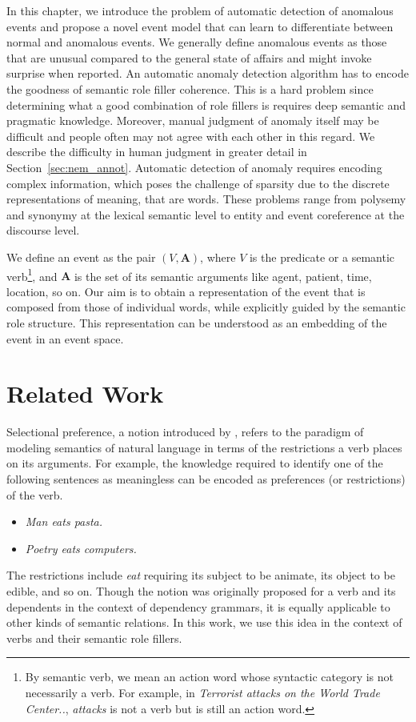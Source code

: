 In this chapter, we introduce the problem of automatic detection of anomalous events
and propose a novel event model that can learn to differentiate
between normal
and anomalous events. We generally define anomalous events as those that are
unusual compared
to the general state of affairs and might invoke surprise when reported. An 
automatic
anomaly detection algorithm has to encode
the goodness of semantic role filler coherence.  This is a hard problem since
determining what a good combination of role fillers is 
requires deep semantic and pragmatic knowledge.  
Moreover, manual judgment of anomaly itself may be difficult and people often
may not agree with each other in this
regard.  We describe the difficulty in human judgment in greater detail in
Section~\ref{sec:nem_annot}.  
Automatic detection of anomaly requires encoding complex information, which
poses the challenge of sparsity
due to the discrete representations of meaning, that are words.  These problems
range from polysemy and synonymy at the 
lexical semantic level to entity and event coreference at the discourse level.

We define an event as the pair $(V, \textbf{A})$, where $V$
is the predicate or a semantic verb\footnote{By semantic verb, we mean an action 
word whose
syntactic category is not necessarily a verb.  
For example, in \textit{Terrorist attacks on the World Trade Center..},
\textit{attacks} is not a verb but is still an 
action word.}, and $\textbf{A}$ is the set of its semantic arguments like agent,
patient, time, location, so on. Our aim
is to obtain a representation of the event that is composed from
those of individual words, while explicitly guided by the semantic
role structure. This representation can be understood as an embedding of the
event in an event space. 

\section{Related Work} \label{sec:nem_background}
Selectional preference, a notion introduced by \cite{wilks1973preference}, 
refers to the paradigm of modeling semantics of
natural language in terms of the restrictions a verb places on its arguments. 
For example, the knowledge required to identify
one of the following sentences as meaningless can be encoded as preferences (or 
restrictions) of the verb.
\begin{itemize}
 \item[] \textit{Man eats pasta.}
 \item[] \textit{Poetry eats computers.}
\end{itemize}
The restrictions include \textit{eat} requiring its subject to be animate, its 
object to be edible, and so on. Though the
notion was originally proposed for a verb and its dependents in the context of 
dependency grammars, it is equally applicable to
other kinds of semantic relations. In this work,
we use this idea in the context of verbs and their semantic role fillers.


